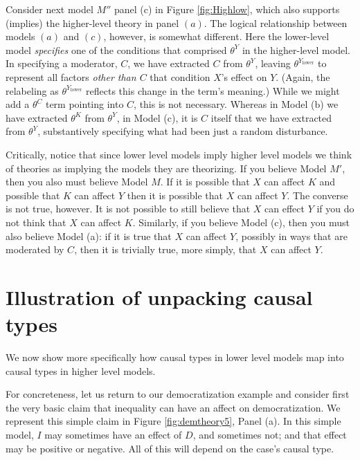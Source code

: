 \documentclass[12pt,]{book}
\begin{document}
Consider next model \(M''\) panel (c) in Figure \ref{fig:Highlow}, which also supports (implies) the higher-level theory in panel \((a)\). The logical relationship between models \((a)\) and \((c)\), however, is somewhat different. Here the lower-level model \emph{specifies} one of the conditions that comprised \(\theta^Y\) in the higher-level model. In specifying a moderator, \(C\), we have extracted \(C\) from \(\theta^Y\), leaving \(\theta^{Y_\text{lower}}\) to represent all factors \emph{other than \(C\)} that condition \(X\)'s effect on \(Y\). (Again, the relabeling as \(\theta^{Y_\text{lower}}\) reflects this change in the term's meaning.) While we might add a \(\theta^C\) term pointing into \(C\), this is not necessary. Whereas in Model (b) we have extracted \(\theta^K\) from \(\theta^Y\), in Model (c), it is \(C\) itself that we have extracted from \(\theta^Y\), substantively specifying what had been just a random disturbance.

Critically, notice that since lower level models imply higher level models we think of theories as implying the models they are theorizing. If you believe Model \(M'\), then you also must believe Model \(M\). If it is possible that \(X\) can affect \(K\) and possible that \(K\) can affect \(Y\) then it is possible that \(X\) can affect \(Y\). The converse is not true, however. It is not possible to still believe that \(X\) can effect \(Y\) if you do not think that \(X\) can affect \(K\). Similarly, if you believe Model (c), then you must also believe Model (a): if it is true that \(X\) can affect \(Y\), possibly in ways that are moderated by \(C\), then it is trivially true, more simply, that \(X\) can affect \(Y\).

\hypertarget{illustration-of-unpacking-causal-types}{%
\section{Illustration of unpacking causal types}\label{illustration-of-unpacking-causal-types}}

We now show more specifically how causal types in lower level models map into causal types in higher level models.

For concreteness, let us return to our democratization example and consider first the very basic claim that inequality can have an affect on democratization. We represent this simple claim in Figure \ref{fig:demtheory5}, Panel (a). In this simple model, \(I\) may sometimes have an effect of \(D\), and sometimes not; and that effect may be positive or negative. All of this will depend on the case's causal type.
\end{document}
